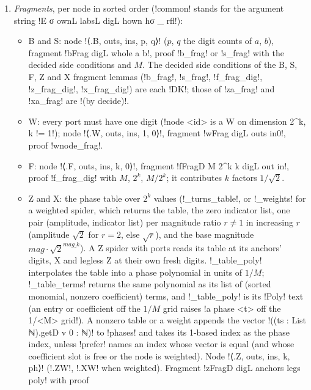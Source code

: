 {{{\begin{algorithm}
\begin{enumerate}
(\lexcode!a digit constraint not reached from its class's variable!). The anchor of a hyperedge is
the label owning its entry variable.
\item \emph{Fragments}, per node in sorted order (\lexcode!common! stands for the argument string
\lexcode!E σ ownL labsL digL hown hσ _ rfl!):
\begin{itemize}
\item B and S: node \lexlean!⟨.B, outs, ins, p, q⟩! ($p$, $q$ the digit counts of $a$, $b$),
fragment \lexlean!bFrag digL whole a b!, proof \lexlean!b_frag! or \lexlean!s_frag! with the decided
side conditions and $M$. The decided side conditions of the B, S, F, Z and X fragment lemmas
(\lexlean!b_frag!, \lexlean!s_frag!, \lexlean!f_frag_dig!, \lexlean!z_frag_dig!, \lexlean!x_frag_dig!) are
each \lexpy!DK!; those of \lexlean!za_frag! and \lexlean!xa_frag! are \lexlean!(by decide)!.
\item W: every port must have one digit (\lexcode!node <id> is a W on dimension 2^k, k != 1!);
node \lexlean!⟨.W, outs, ins, 1, 0⟩!, fragment \lexlean!wFrag digL outs in0!, proof
\lexlean!wnode_frag!.
\item F: node \lexlean!⟨.F, outs, ins, k, 0⟩!, fragment \lexlean!fFragD M 2^k k digL out in!, proof
\lexlean!f_frag_dig! with $M$, $2^{k}$, $M/2^{k}$; it contributes $k$ factors $1/\sqrt2$.
\item Z and X: the phase table over $2^{k}$ values (\lexpy!_turns_table!, or \lexpy!_weights! for a
weighted spider, which returns the table, the zero indicator list, one pair (amplitude,
indicator list) per magnitude ratio $r\neq 1$ in increasing $r$ (amplitude $\sqrt2$ for $r=2$,
else $\sqrt r$), and the base magnitude $\mathit{mag}\cdot\sqrt2^{\mathit{mag\_k}}$). A Z spider with ports reads its table at
its anchors' digits, X and legless Z at their own fresh digits. \lexpy!_table_poly! interpolates
the table into a phase polynomial in units of $1/M$; \lexpy!_table_terms! returns the same
polynomial as its list of (sorted monomial, nonzero coefficient) terms, and \lexpy!_table_poly! is
its \lexlean!Poly! text (an entry or coefficient off the $1/M$
grid raises \lexcode!a phase <t> off the 1/<M> grid!). A nonzero table or a weight appends the
vector \lexcode!((ts : List ℕ).getD v 0 : ℕ)! to \lexcode!phases! and takes its 1-based index as the
phase index, unless \lexcode!prefer! names an index whose vector is equal (and whose coefficient
slot is free or the node is weighted). Node \lexlean!⟨.Z, outs, ins, k, ph⟩! (\lexlean!.ZW!,
\lexlean!.XW! when weighted). Fragment \lexlean!zFragD digL anchors legs poly! with proof

\end{itemize}
\end{enumerate}
\end{algorithm}}}}
